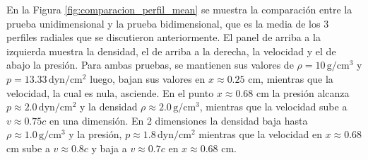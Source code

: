 \documentclass[12pt,a4paper]{book}
\begin{document}
En la Figura \ref{fig:comparacion_perfil_mean} se muestra la comparación entre la prueba unidimensional
y la prueba bidimensional, que es la media de los 3 perfiles radiales que se discutieron anteriormente.
El panel de arriba a la izquierda muestra la densidad, el de arriba a la derecha, la velocidad y 
el de abajo la presión. Para ambas pruebas, se mantienen sus valores de 
$\rho = 10 \,  \text{g}/ \text{cm}^3$ y $p = 13.33 \,  \text{dyn}/ \text{cm}^2 $ 
luego, bajan sus valores en $x \approx 0.25$ cm,
mientras que la velocidad, la cual es nula,
asciende. En el punto $x \approx 0.68$ cm la presión alcanza 
$p \approx 2.0\,  \text{dyn}/ \text{cm}^2 $ y la densidad
$\rho \approx 2.0 \,  \text{g}/ \text{cm}^3$, mientras que la velocidad sube a $v \approx 0.75c$
en una dimensión. En 2 dimensiones la densidad baja hasta  $\rho \approx 1.0 \,  \text{g}/ \text{cm}^3$ y
la presión, $p \approx 1.8\,  \text{dyn}/ \text{cm}^2 $ mientras que la velocidad en $x \approx 0.68$ cm
sube a $v \approx 0.8c$ y baja a $v \approx 0.7c$ en $x \approx 0.68$ cm.
\end{document}
